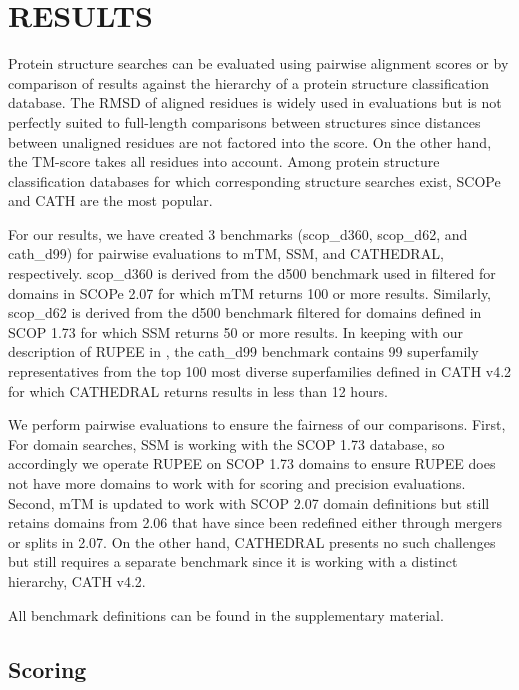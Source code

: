\documentclass[a4,center,fleqn]{NAR}
\begin{document}
\section{RESULTS}

Protein structure searches can be evaluated using pairwise alignment scores or by comparison of results against the hierarchy of a protein structure classification database.
The RMSD of aligned residues is widely used in evaluations but is not perfectly suited to full-length comparisons between structures since distances between unaligned residues are not factored into the score.
On the other hand, the TM-score \cite{Zhang2004} takes all residues into account. 
Among protein structure classification databases for which corresponding structure searches exist, SCOPe \citep{Fox2013} and CATH \citep{Orengo1997} are the most popular. 

For our results, we have created 3 benchmarks (scop\_d360, scop\_d62, and cath\_d99) for pairwise evaluations to mTM, SSM, and CATHEDRAL, respectively.
scop\_d360 is derived from the d500 benchmark used in \cite{Dong2018} filtered for domains in SCOPe 2.07 for which mTM returns 100 or more results.
Similarly, scop\_d62 is derived from the d500 benchmark filtered for domains defined in SCOP 1.73 for which SSM returns 50 or more results.  
In keeping with our description of RUPEE in \cite{Ayoub2017}, the cath\_d99 benchmark contains 99 superfamily representatives from the top 100 most diverse superfamilies defined in CATH v4.2 for which CATHEDRAL returns results in less than 12 hours. 

We perform pairwise evaluations to ensure the fairness of our comparisons. 
First, For domain searches, SSM is working with the SCOP 1.73 database, so accordingly we operate RUPEE on SCOP 1.73 domains to ensure RUPEE does not have more domains to work with for scoring and precision evaluations. 
Second, mTM is updated to work with SCOP 2.07 domain definitions but still retains domains from 2.06 that have since been redefined either through mergers or splits in 2.07. 
On the other hand, CATHEDRAL presents no such challenges but still requires a separate benchmark since it is working with a distinct hierarchy, CATH v4.2. 

All benchmark definitions can be found in the supplementary material. 

\subsection{Scoring}
\end{document}
